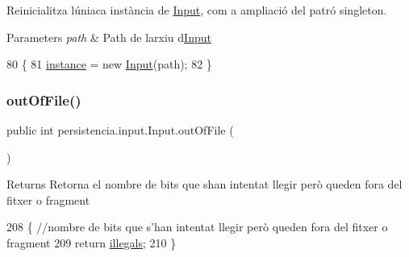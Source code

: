 Reinicialitza l\textquotesingle{}úniaca instància de \hyperlink{classpersistencia_1_1input_1_1Input}{Input}, com a ampliació del patró singleton. 


\begin{DoxyParams}{Parameters}
{\em path} & Path de l\textquotesingle{}arxiu d\textquotesingle{}\hyperlink{classpersistencia_1_1input_1_1Input}{Input} \\
\hline
\end{DoxyParams}

\begin{DoxyCode}
80                                                \{
81         \hyperlink{classpersistencia_1_1input_1_1Input_a2e516b1cbef9b704c10fd932b3d11afd}{instance} = \textcolor{keyword}{new} \hyperlink{classpersistencia_1_1input_1_1Input_a9b30ef8d489a1fc5b4aa04a14474349a}{Input}(path);
82     \}
\end{DoxyCode}
\mbox{\label{classpersistencia_1_1input_1_1Input_a3f0fc057e91430b81f5f2c92f91b8ed7}} 
\subsubsection{\texorpdfstring{out\+Of\+File()}{outOfFile()}}
{\footnotesize\ttfamily public int persistencia.\+input.\+Input.\+out\+Of\+File (\begin{DoxyParamCaption}{ }\end{DoxyParamCaption})\hspace{0.3cm}{\ttfamily [inline]}}

\begin{DoxyReturn}{Returns}
Retorna el nombre de bits que s\textquotesingle{}han intentat llegir però queden fora del fitxer o fragment 
\end{DoxyReturn}

\begin{DoxyCode}
208                            \{ \textcolor{comment}{//nombre de bits que s'han intentat llegir però queden fora del fitxer o
       fragment}
209         \textcolor{keywordflow}{return} \hyperlink{classpersistencia_1_1input_1_1Input_ad3132949d4ac469b5f4d77373389f9f1}{illegals};
210     \}
\end{DoxyCode}
\mbox{\label{classpersistencia_1_1input_1_1Input_a24eae4109b4ff4954ff2d7feef2fa4e4}} 
